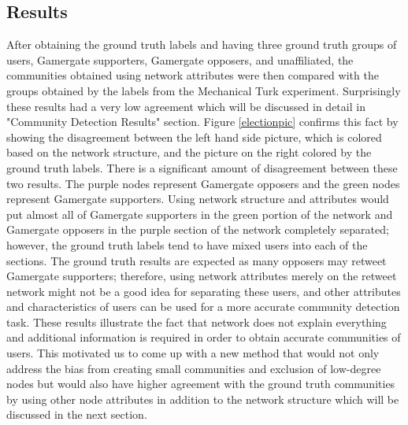 \subsection{Results}
After obtaining the ground truth labels and having three ground truth groups of users, Gamergate supporters, Gamergate opposers, and unaffiliated, the communities obtained using network attributes were then compared with the groups obtained by the labels from the Mechanical Turk experiment. Surprisingly these results had a very low agreement which will be discussed in detail in "Community Detection Results" section. Figure \ref{electionpic} confirms this fact by showing the disagreement between the left hand side picture, which is colored based on the network structure, and the picture on the right colored by the ground truth labels. There is a significant amount of disagreement between these two results. The purple nodes represent Gamergate opposers and the green nodes represent Gamergate supporters. Using network structure and attributes would put almost all of Gamergate supporters in the green portion of the network and Gamergate opposers in the purple section of the network completely separated; however, the ground truth labels tend to have mixed users into each of the sections. The ground truth results are expected as many opposers may retweet Gamergate supporters; therefore, using network attributes merely on the retweet network might not be a good idea for separating these users, and other attributes and characteristics of users can be used for a more accurate community detection task. These results illustrate the fact that network does not explain everything and additional information is required in order to obtain accurate communities of users. This motivated us to come up with a new method that would not only address the bias from creating small communities and exclusion of low-degree nodes but would also have higher agreement with the ground truth communities by using other node attributes in addition to the network structure which will be discussed in the next section.
